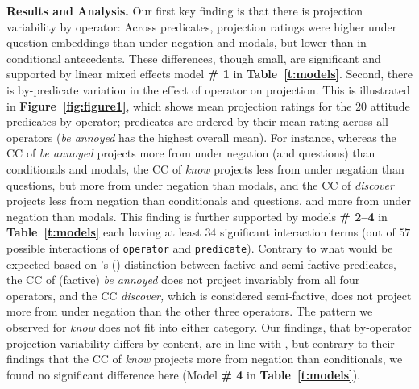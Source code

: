 \documentclass[12pt, a4paper]{article}
\newcommand{\posscite}[1]{\citeauthor{#1}'s (\citeyear{#1})}
\begin{document}
\noindent
{\bf Results and Analysis.} 
	Our first key finding is that there is projection variability by operator: Across predicates, projection ratings were higher under question-embeddings than under negation and modals, but lower than in conditional antecedents. These differences, though small, are significant and supported by linear mixed effects model \textbf{\# 1} in \textbf{Table\ \ref{t:models}}. 
	Second, there is by-predicate variation in the effect of operator on projection. This is illustrated in \textbf{Figure~\ref{fig:figure1}}, which shows mean projection ratings for the 20 attitude predicates by operator; predicates are ordered by their mean rating across all operators (\emph{be annoyed} has the highest overall mean).
	For instance, whereas the CC of \emph{be annoyed} projects more from under negation (and questions) than conditionals and modals, the CC of \emph{know} projects less from under negation than questions, but more from under negation than modals, and the CC of \emph{discover} projects less from negation than conditionals and questions, and more from under negation than modals. This finding is further supported by models \textbf{\# 2--4} in \textbf{Table\ \ref{t:models}} each having at least $34$ significant interaction terms (out of $57$ possible interactions of \texttt{operator} and \texttt{predicate}).
	Contrary to what would be expected based on \posscite{karttunen_observations_1971}
	distinction between factive and semi-factive predicates,
	the CC of (factive) \emph{be annoyed} does not project invariably from all four operators, and the CC \emph{discover,}  which is considered semi-factive, does not project more from under negation than the other three operators. The pattern we observed for {\em know} does not fit into either category.
	Our findings, that by-operator projection variability differs by content, are in line with \citet{smith_relationship_2014}, but contrary to their findings that the CC of \emph{know} projects more from negation than conditionals, we found no significant difference here (Model \textbf{\# 4} in \textbf{Table\ \ref{t:models}}).\\
\end{document}
